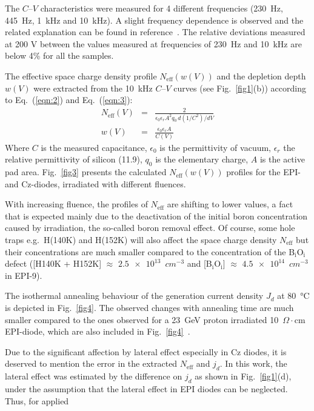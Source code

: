 \documentclass[final, 5p, times]{elsarticle}
\begin{document}
The $C$--$V$ characteristics were measured for 4 different frequencies (\SI{230}{\hertz}, \SI{445}{\hertz}, \SI{1}{\kilo\hertz} and \SI{10}{\kilo\hertz}). A slight frequency dependence is observed and the related explanation can be found in reference~\cite{b25, b26}. The relative deviations measured at 200 V between the values measured at frequencies of \SI{230}{\hertz} and \SI{10}{\kilo\hertz} are below 4\% for all the samples.
\par
The effective space charge density profile $N_\text{eff}(w(V))$ and the depletion depth
$w(V)$ were extracted from the 10~kHz $C$--$V$ curves (see Fig.~\ref{fig1}(b)) according to Eq.~(\ref{eqn:2}) and Eq.~(\ref{eqn:3}):
\begin{eqnarray}
N_\text{eff} (V) & = & \frac{2}{\epsilon_0 \epsilon_r A^2 q_0\,d(1/C^2)/dV} \label{eqn:2}\\
w (V) & = & \frac{\epsilon_0 \epsilon_r A}{C(V)} \label{eqn:3}
\end{eqnarray}
Where $C$ is the measured capacitance, $\epsilon_0$ is the permittivity of vacuum, $\epsilon_r$ the relative permittivity of silicon (11.9), $q_0$ is the elementary charge, $A$ is the active pad area. Fig.~\ref{fig3} presents the calculated $N_\text{eff}(w(V))$ profiles for the EPI- and Cz-diodes, irradiated with different fluences. 
\par
With increasing fluence, the profiles of $N_\text{eff}$ are shifting to lower values, a fact that is expected mainly due to the deactivation of the initial boron concentration caused by irradiation, the so-called boron removal effect. Of course, some hole traps e.g.\ H(140K) and H(152K) will also affect the space charge density $N_\text{eff}$ but their concentrations are much smaller compared to the concentration of the B$_\text{i}$O$_\text{i}$ defect ([H140K + H152K] $\approx$ $\num{2.5e13}$~$\si{cm^{-3}}$ and [B$_\text{i}$O$_\text{i}$] $\approx$ $\num{4.5e14}$~$\si{cm^{-3}}$ in EPI-9).
\par
The isothermal annealing behaviour of the generation current density $J_{d}$ at \SI{80}{\celsius} is depicted in Fig.~\ref{fig4}. The observed changes with annealing time are much smaller compared to the ones observed for a \SI{23}{\giga\electronvolt} proton irradiated 10~$\si{\Omega\cdot}$cm EPI-diode, which are also included in Fig.~\ref{fig4}~\cite{b27}.
\par
Due to the significant affection by lateral effect especially in Cz diodes, it is deserved to mention the error in the extracted $N_\text{eff}$ and $j_d$. In this work, the lateral effect was estimated by the difference on $j_d$ as shown in Fig.~\ref{fig1}(d), under the assumption that the lateral effect in EPI diodes can be neglected. Thus, for applied
\end{document}
